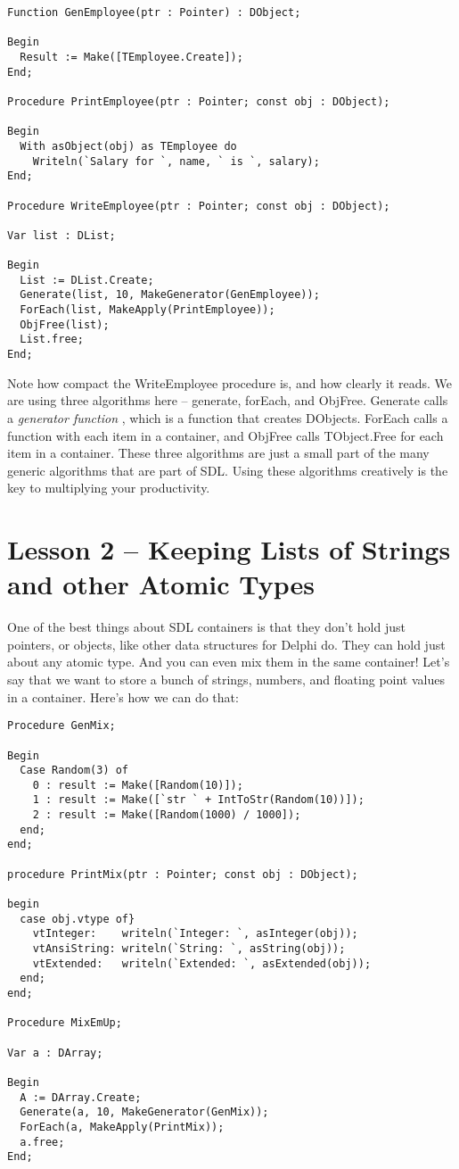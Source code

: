\documentclass{report}
\begin{document}
\begin{lstlisting}
Function GenEmployee(ptr : Pointer) : DObject;

Begin
  Result := Make([TEmployee.Create]);
End;

Procedure PrintEmployee(ptr : Pointer; const obj : DObject);

Begin
  With asObject(obj) as TEmployee do
    Writeln(`Salary for `, name, ` is `, salary);
End;

Procedure WriteEmployee(ptr : Pointer; const obj : DObject);

Var list : DList;

Begin
  List := DList.Create;
  Generate(list, 10, MakeGenerator(GenEmployee));
  ForEach(list, MakeApply(PrintEmployee));
  ObjFree(list);
  List.free;
End;
\end{lstlisting}

Note how compact the WriteEmployee procedure is, and how clearly it reads.
We are using three algorithms here -- generate, forEach, and ObjFree. 
Generate calls a \emph{generator function} , which is a function that
creates DObjects. ForEach calls a function with each item in a container,
and ObjFree calls TObject.Free for each item in a container. These three
algorithms are just a small part of the many generic algorithms that are
part of SDL. Using these algorithms creatively is the key to multiplying
your productivity.

\section{Lesson 2 -- Keeping Lists of Strings and other Atomic Types}

One of the best things about SDL containers is that they don't hold just
pointers, or objects, like other data structures for Delphi do. They can
hold just about any atomic type. And you can even mix them in the same
container! Let's say that we want to store a bunch of strings, numbers, and
floating point values in a container. Here's how we can do that:

\begin{lstlisting}
Procedure GenMix;

Begin
  Case Random(3) of
    0 : result := Make([Random(10)]);
    1 : result := Make([`str ` + IntToStr(Random(10))]);
    2 : result := Make([Random(1000) / 1000]);
  end;
end;

procedure PrintMix(ptr : Pointer; const obj : DObject);

begin
  case obj.vtype of}
    vtInteger:    writeln(`Integer: `, asInteger(obj));
    vtAnsiString: writeln(`String: `, asString(obj));
    vtExtended:   writeln(`Extended: `, asExtended(obj));
  end;
end;

Procedure MixEmUp;

Var a : DArray;

Begin
  A := DArray.Create;
  Generate(a, 10, MakeGenerator(GenMix)); 
  ForEach(a, MakeApply(PrintMix));
  a.free;
End;
\end{lstlisting}
\end{document}
